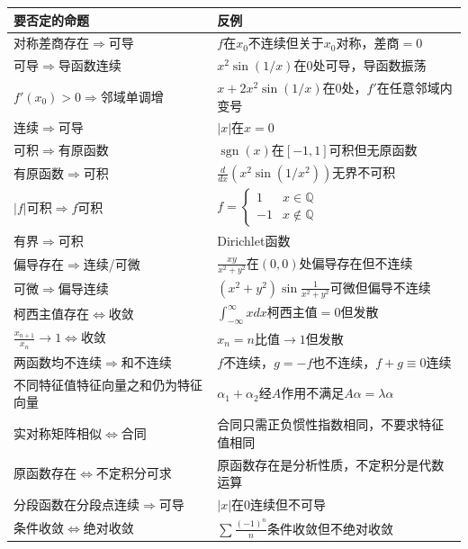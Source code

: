 \documentclass[12pt,a4paper]{ctexbook}
\begin{document}
\begin{center}\small
\begin{tabular}{p{4.5cm}p{7.5cm}}
\toprule
\textbf{要否定的命题} & \textbf{反例} \\
\midrule
对称差商存在$\Rightarrow$可导 & $f$在$x_0$不连续但关于$x_0$对称，差商$=0$ \\
\midrule
可导$\Rightarrow$导函数连续 & $x^2\sin(1/x)$在$0$处可导，导函数振荡 \\
\midrule
$f'(x_0)>0\Rightarrow$邻域单调增 & $x+2x^2\sin(1/x)$在$0$处，$f'$在任意邻域内变号 \\
\midrule
连续$\Rightarrow$可导 & $|x|$在$x=0$ \\
\midrule
可积$\Rightarrow$有原函数 & $\operatorname{sgn}(x)$在$[-1,1]$可积但无原函数 \\
\midrule
有原函数$\Rightarrow$可积 & $\frac{d}{dx}(x^2\sin(1/x^2))$无界不可积 \\
\midrule
$|f|$可积$\Rightarrow f$可积 & $f=\begin{cases}1&x\in\mathbb{Q}\\-1&x\notin\mathbb{Q}\end{cases}$ \\
\midrule
有界$\Rightarrow$可积 & Dirichlet函数 \\
\midrule
偏导存在$\Rightarrow$连续/可微 & $\frac{xy}{x^2+y^2}$在$(0,0)$处偏导存在但不连续 \\
\midrule
可微$\Rightarrow$偏导连续 & $(x^2+y^2)\sin\frac{1}{x^2+y^2}$可微但偏导不连续 \\
\midrule
柯西主值存在$\Leftrightarrow$收敛 & $\int_{-\infty}^{\infty}xdx$柯西主值$=0$但发散 \\
\midrule
$\frac{x_{n+1}}{x_n}\to 1\iff$收敛 & $x_n=n$比值$\to 1$但发散 \\
\midrule
两函数均不连续$\Rightarrow$和不连续 & $f$不连续，$g=-f$也不连续，$f+g\equiv 0$连续 \\
\midrule
不同特征值特征向量之和仍为特征向量 & $\alpha_1+\alpha_2$经$A$作用不满足$A\alpha=\lambda\alpha$ \\
\midrule
实对称矩阵相似$\iff$合同 & 合同只需正负惯性指数相同，不要求特征值相同 \\
\midrule
原函数存在$\iff$不定积分可求 & 原函数存在是分析性质，不定积分是代数运算 \\
\midrule
分段函数在分段点连续$\Rightarrow$可导 & $|x|$在$0$连续但不可导 \\
\midrule
条件收敛$\Leftrightarrow$绝对收敛 & $\sum\frac{(-1)^n}{n}$条件收敛但不绝对收敛 \\
\bottomrule
\end{tabular}
\end{center}
\end{document}
